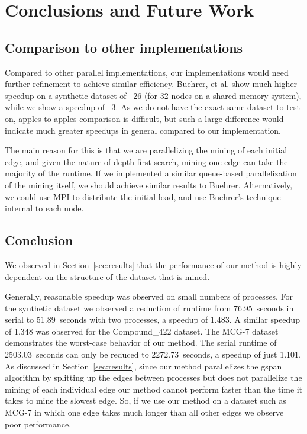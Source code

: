 \section{Conclusions and Future Work}
\label{sec:conclusions}

\subsection{Comparison to other implementations}
\label{subsec:comparison}

Compared to other parallel implementations, our implementations would need
further refinement to achieve similar efficiency.  Buehrer, et al. show
much higher speedup on a synthetic dataset of ~26 (for 32 nodes on a shared
memory system), while we show a speedup of ~3.  As we do not have the exact
same dataset to test on, apples-to-apples comparison is difficult, but such a
large difference would indicate much greater speedups in general compared to
our implementation.   

The main reason for this is that we are parallelizing the mining of each 
initial edge, and given the nature of depth first search, mining one edge 
can take the majority of the runtime.  If we implemented a similar 
queue-based parallelization of the mining itself, we should achieve similar 
results to Buehrer.  Alternatively, we could use MPI to distribute the 
initial load, and use Buehrer's technique internal to each node.  

\subsection{Conclusion}
\label{subsec:conclusions}

We observed in Section~\ref{sec:results} that the performance of our method
is highly dependent on the structure of the dataset that is mined.

Generally, reasonable speedup was observed on small numbers of processes. For
the synthetic dataset we observed a reduction of runtime from 76.95~seconds
in serial to 51.89~seconds with two processes, a speedup of 1.483. A similar
speedup of 1.348 was observed for the Compound\_422 dataset. The MCG-7 dataset
demonstrates the worst-case behavior of our method. The serial runtime of
2503.03~seconds can only be reduced to 2272.73~seconds, a speedup of just
1.101. As discussed in Section~\ref{sec:results}, since our method
parallelizes the gspan algorithm by splitting up the edges between processes
but does not parallelize the mining of each individual edge our method cannot
perform faster than the time it takes to mine the slowest edge. So, if we
use our method on a dataset such as MCG-7 in which one edge takes much longer
than all other edges we observe poor performance.

